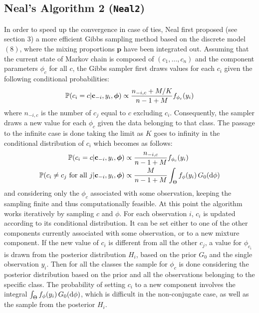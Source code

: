 \subsection{Neal's Algorithm 2 (\texttt{Neal2})}
In order to speed up the convergence in case of ties, Neal first proposed (see \cite{neal} section 3) a more efficient Gibbs sampling method based on the discrete model $(8)$, where the mixing proportions $\textbf{p}$ have been integrated out. %
Assuming that the current state of Markov chain is composed of $(c_1,\dots,c_n)$  and the component parameters $\phi_c$ for all $c$, the Gibbs sampler first draws values for each $c_i$ given the following conditional probabilities:
\begin{align}
			\mathbb P(c_{i}=c | \mathbf c_{-i}, y_{i},\boldsymbol\phi) \propto \frac{n_{-i,c} + M/{K}}{n-1+M} f_{\phi_{c}}(y_{i}) 
\end{align}
where $n_{-i,c}$ is the number of $c_j$ equal to $c$ excluding $c_i$.
Consequently, the sampler draws a new value for each $\phi_c$ given the data belonging to that class.
The passage to the infinite case is done taking the limit as $K$ goes to infinity in the conditional distribution of $c_i$ which becomes as follows:
\begin{align}
	\mathbb P(c_{i}=c | \mathbf c_{-i}, y_{i},\boldsymbol\phi) &\propto \frac{n_{-i,c} }{n-1+M} f_{\phi_{c}}(y_{i}) \\
	\mathbb P(c_{i}\neq c_{j} \text{ for all } j | \mathbf c_{-i}, y_{i},\boldsymbol\phi) &\propto \frac{M }{n-1+M} \int_{\Theta} f_{\phi}(y_{i}) \, G_0(\mathrm d\phi) \nonumber 
\end{align}
and considering only the $\phi_c$ associated with some observation, keeping the sampling finite and thus computationally feasible.
At this point the algorithm works iteratively by sampling $c$ and $\phi$.
For each observation $i$, $c_i$ is updated according to its conditional distribution.
It can be set either to one of the other components currently associated with some observation, or to a new mixture component.
If the new value of $c_i$ is different from all the other $c_j$, a value for $\phi_{c_i}$ is drawn from the posterior distribution $H_i$, based on the prior $G_0$ and the single observation $y_i$.
Then for all the classes the  sample for $\phi_c$ is done considering the posterior distribution based on the prior and all the observations belonging to the specific class.
The probability of setting $c_i$ to a new component involves the integral $\int_{\Theta} f_{\phi}(y_{i}) \, G_0(\mathrm d\phi)$, which is difficult in the non-conjugate case, as well as the sample from the posterior $H_i$.

